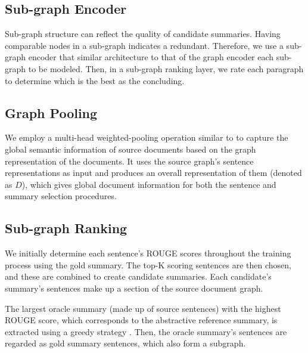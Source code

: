\documentclass[11pt]{article}
\begin{document}
\subsection{Sub-graph Encoder}
Sub-graph structure can reflect the quality of candidate summaries. Having comparable nodes in a sub-graph indicates a redundant. Therefore, we use a sub-graph encoder that similar architecture to that of the graph encoder each sub-graph to be modeled. Then, in a sub-graph ranking layer, we rate each paragraph to determine which is the best as the concluding. 

\subsection{Graph Pooling}
We employ a multi-head weighted-pooling operation similar to \cite{liu-lapata-2019-hierarchical} to capture the global semantic information of source documents based on the graph representation of the documents. It uses the source graph's sentence representations as input and produces an overall representation of them (denoted as $D$), which gives global document information for both the sentence and summary selection procedures.

\subsection{Sub-graph Ranking}

We initially determine each sentence's ROUGE scores throughout the training process using the gold summary. The top-K scoring sentences are then chosen, and these are combined to create candidate summaries. Each candidate's summary's sentences make up a section of the source document graph.

The largest oracle summary (made up of source sentences) with the highest ROUGE score, which corresponds to the abstractive reference summary, is extracted using a greedy strategy \cite{nallapati2017summarunner}. Then, the oracle summary's sentences are regarded as gold summary sentences, which also form a subgraph.
\end{document}

